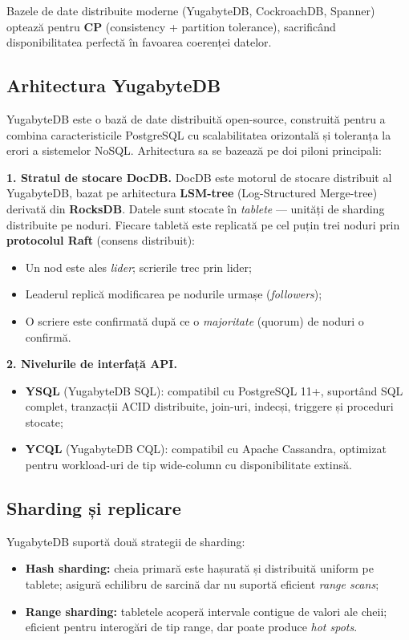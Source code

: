 Bazele de date distribuite moderne (YugabyteDB, CockroachDB, Spanner) optează
pentru \textbf{CP} (consistency + partition tolerance), sacrificând disponibilitatea
perfectă în favoarea coerenței datelor.

\subsection{Arhitectura YugabyteDB}
\label{subsec:yugabyte_arhitectura}

YugabyteDB \cite{yugabyte2024} este o bază de date distribuită open-source,
construită pentru a combina caracteristicile PostgreSQL cu scalabilitatea
orizontală și toleranța la erori a sistemelor NoSQL. Arhitectura sa se bazează
pe doi piloni principali:

\textbf{1. Stratul de stocare DocDB.} DocDB este motorul de stocare
distribuit al YugabyteDB, bazat pe arhitectura \textbf{LSM-tree} (Log-Structured
Merge-tree) derivată din \textbf{RocksDB}. Datele sunt stocate în \emph{tablete}
--- unități de sharding distribuite pe noduri. Fiecare tabletă este replicată
pe cel puțin trei noduri prin \textbf{protocolul Raft} (consens distribuit):
\begin{itemize}
    \item Un nod este ales \emph{lider}; scrierile trec prin lider;
    \item Leaderul repl\-ică modificarea pe nodurile urmașe (\emph{followers});
    \item O scriere este confirmată după ce o \emph{majoritate} (quorum) de
    noduri o confirmă.
\end{itemize}

\textbf{2. Nivelurile de interfață API.}
\begin{itemize}
    \item \textbf{YSQL} (YugabyteDB SQL): compatibil cu PostgreSQL 11+,
    suportând SQL complet, tranzacții ACID distribuite, join-uri, indecși,
    triggere și proceduri stocate;
    \item \textbf{YCQL} (YugabyteDB CQL): compatibil cu Apache Cassandra,
    optimizat pentru workload-uri de tip wide-column cu disponibilitate extinsă.
\end{itemize}

\subsection{Sharding și replicare}
\label{subsec:sharding}

YugabyteDB suportă două strategii de sharding:
\begin{itemize}
    \item \textbf{Hash sharding:} cheia primară este hașurată și distribuită
    uniform pe tablete; asigură echilibru de sarcină dar nu suportă eficient
    \emph{range scans};
    \item \textbf{Range sharding:} tabletele acoperă intervale contigue de
    valori ale cheii; eficient pentru interogări de tip range, dar poate
    produce \emph{hot spots}.
\end{itemize}

